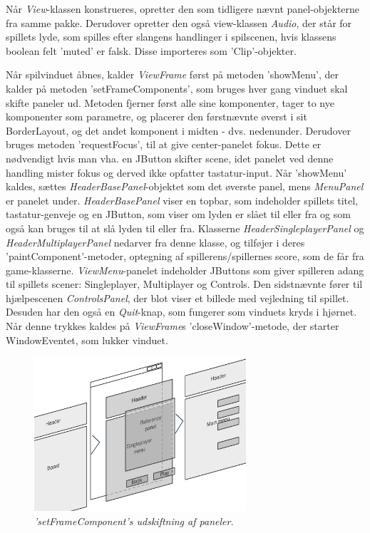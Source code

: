 Når \textit{View}-klassen konstrueres, opretter den som tidligere nævnt panel-objekterne fra samme pakke. Derudover opretter den også view-klassen \textit{Audio}, der står for spillets lyde, som spilles efter slangens handlinger i spilscenen, hvis klassens boolean felt 'muted' er falsk. Disse importeres som 'Clip'-objekter. 
\newline

Når spilvinduet åbnes, kalder \textit{ViewFrame} først på metoden 'showMenu', der kalder på metoden 'setFrameComponents', som bruges hver gang vinduet skal skifte paneler ud. Metoden fjerner først alle sine komponenter, tager to nye komponenter som parametre, og placerer den førstnævnte øverst i sit BorderLayout, og det andet komponent i midten - dvs. nedenunder. Derudover bruges metoden 'requestFocus', til at give center-panelet fokus. Dette er nødvendigt hvis man vha. en JButton skifter scene, idet panelet ved denne handling mister fokus og derved ikke opfatter tastatur-input. 
Når 'showMenu' kaldes, sættes \textit{HeaderBasePanel}-objektet som det øverste panel, mens \textit{MenuPanel} er panelet under. \textit{HeaderBasePanel} viser en topbar, som indeholder spillets titel, tastatur-genveje og en JButton, som viser om lyden er slået til eller fra og som også kan bruges til at slå lyden til eller fra. Klasserne \textit{HeaderSingleplayerPanel} og \textit{HeaderMultiplayerPanel} nedarver fra denne klasse, og tilføjer i deres 'paintComponent'-metoder, optegning af spillerens/spillernes score, som de får fra game-klasserne.
\textit{ViewMenu}-panelet indeholder JButtons som giver spilleren adang til spillets scener: Singleplayer, Multiplayer og Controls. Den sidstnævnte fører til hjælpescenen \textit{ControlsPanel}, der blot viser et billede med vejledning til spillet. Desuden har den også en \textit{Quit}-knap, som fungerer som vinduets kryds i hjørnet. Når denne trykkes kaldes på \textit{ViewFrame}s 'closeWindow'-metode, der starter WindowEventet, som lukker vinduet.

\begin{figure}[h]
	\centering
   	\includegraphics[width=0.7\textwidth]{View.png}
	\caption{\textit{'setFrameComponent's udskiftning af paneler.}}
\end{figure}


